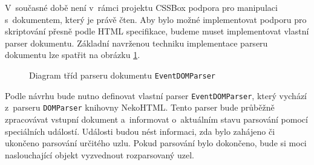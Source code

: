 V~současné době není v~rámci projektu CSSBox podpora pro manipulaci s~dokumentem, který je právě čten. Aby bylo možné implementovat podporu pro skriptování přesně podle HTML specifikace, budeme muset implementovat vlastní parser dokumentu. Základní navrženou techniku implementace parseru dokumentu lze spatřit na obrázku \ref{Figure.EventDOMParserDesign}.

\begin{figure}[H]
  \begin{center}
    \caption{Diagram tříd parseru dokumentu \texttt{EventDOMParser}}
    \label{Figure.EventDOMParserDesign}
  \end{center}
\end{figure}

Podle návrhu bude nutno definovat vlastní parser \texttt{EventDOMParser}, který vychází z~parseru \texttt{DOMParser} knihovny NekoHTML. Tento parser bude průběžně zpracovávat vstupní dokument a~informovat o~aktuálním stavu parsování pomocí speciálních událostí. Události budou nést informaci, zda bylo zahájeno či ukončeno parsování určitého uzlu. Pokud parsování bylo dokončeno, bude si moci naslouchající objekt vyzvednout rozparsovaný uzel. 

